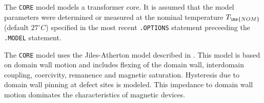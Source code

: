 \vfill

The {\tt CORE} model models a transformer core. It is assumed that
the model parameters were determined or measured at the nominal
temperature $T_{\ms{NOM}}$ (default $27^{\circ}C$) specified in
the most recent {\tt .OPTIONS} statement preceeding the {\tt
.MODEL} statement.

The {\tt CORE} model uses the Jiles-Atherton model described in
\cite{jiles:atherton:86}. This model is based on domain wall
motion and includes flexing of the domain wall, interdomain
coupling, coercivity, remanence and magnetic saturation.
Hysteresis due to domain wall pinning at defect sites is modeled.
This impedance to domain wall motion dominates the characteristics
of magnetic devices.

